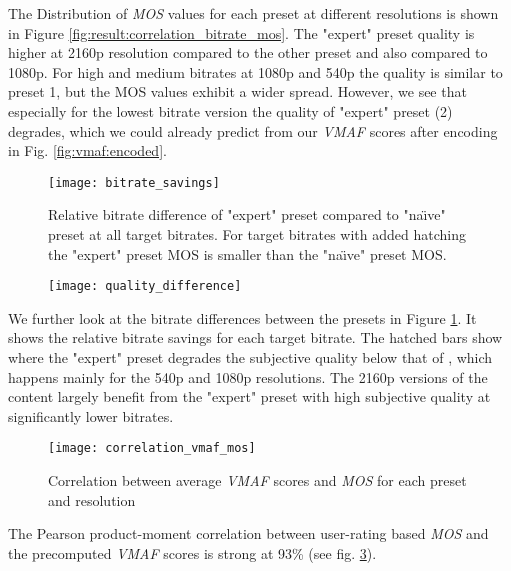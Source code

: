 The Distribution of \textit{MOS} values for each preset at different resolutions is shown in Figure \ref{fig:result:correlation_bitrate_mos}.
The "expert" preset quality is higher at 2160p resolution compared to the other preset and also compared to 1080p. For high and medium bitrates at 1080p and 540p the quality is similar to preset 1, but the MOS values exhibit a wider spread.
However, we see that especially for the lowest bitrate version the quality of "expert" preset (2) degrades, which we could already predict from our \textit{VMAF} scores after encoding in Fig. \ref{fig:vmaf:encoded}.

\begin{figure}[htb!]
	\centering
	\texttt{[image: bitrate\_savings]}
	\caption{Relative bitrate difference of "expert" preset compared to "na\"{\i}ve" preset at all target bitrates. For target bitrates with added hatching the "expert" preset MOS is smaller than the "na\"{\i}ve" preset MOS.}
	\label{fig:result:bitrate_savings}
\end{figure}
\begin{figure}[htb!]
	\centering
	\texttt{[image: quality\_difference]}
	\caption{}
	\label{fig:result:quality_difference}
\end{figure}

We further look at the bitrate differences between the presets in Figure \ref{fig:result:bitrate_savings}. It shows the relative bitrate savings for each target bitrate. The hatched bars show where the "expert" preset degrades the subjective quality below that of , which happens mainly for the 540p and 1080p resolutions. The 2160p versions of the content largely benefit from the "expert" preset with high subjective quality at significantly lower bitrates.


\begin{figure}[htb!]
	\centering
	\texttt{[image: correlation\_vmaf\_mos]}
	\caption{Correlation between average \textit{VMAF} scores and \textit{MOS} for each preset and resolution}
	\label{fig:result:correlation_vmaf_mos}
\end{figure}

The Pearson product-moment correlation between user-rating based \textit{MOS} and the precomputed \textit{VMAF} scores is strong at 93\% (see fig. \ref{fig:result:correlation_vmaf_mos}).
\\
